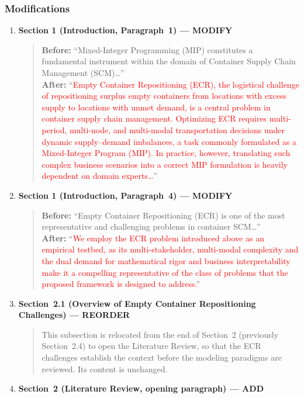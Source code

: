 \documentclass[11pt,a4paper]{article}
\begin{document}
\subsubsection{Modifications}
\begin{enumerate}
\item \textbf{Section 1 (Introduction, Paragraph~1) --- MODIFY}
\begin{quote}
\textbf{Before:} ``Mixed-Integer Programming (MIP) constitutes a fundamental instrument within the domain of Container Supply Chain Management (SCM)\ldots''\\[4pt]
\textbf{After:} ``\textcolor{red}{Empty Container Repositioning (ECR), the logistical challenge of repositioning surplus empty containers from locations with excess supply to locations with unmet demand, is a central problem in container supply chain management. Optimizing ECR requires multi-period, multi-node, and multi-modal transportation decisions under dynamic supply--demand imbalances, a task commonly formulated as a Mixed-Integer Program (MIP). In practice, however, translating such complex business scenarios into a correct MIP formulation is heavily dependent on domain experts\ldots}''
\end{quote}
\item \textbf{Section 1 (Introduction, Paragraph~4) --- MODIFY}
\begin{quote}
\textbf{Before:} ``Empty Container Repositioning (ECR) is one of the most representative and challenging problems in container SCM\ldots''\\[4pt]
\textbf{After:} ``\textcolor{red}{We employ the ECR problem introduced above as an empirical testbed, as its multi-stakeholder, multi-modal complexity and the dual demand for mathematical rigor and business interpretability make it a compelling representative of the class of problems that the proposed framework is designed to address.}''
\end{quote}
\item \textbf{Section~2.1 (Overview of Empty Container Repositioning Challenges) --- REORDER}
\begin{quote}
This subsection is relocated from the end of Section~2 (previously Section~2.4) to open the Literature Review, so that the ECR challenges establish the context before the modeling paradigms are reviewed. Its content is unchanged.
\end{quote}
\item \textbf{Section~2 (Literature Review, opening paragraph) --- ADD}
\begin{quote}

\end{quote}
\end{enumerate}
\end{document}
